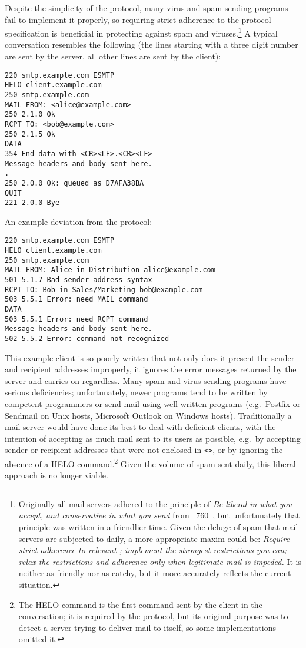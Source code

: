 \SMTPglossaryDescription{} Despite the simplicity of the protocol, many
virus and spam sending programs fail to implement it properly, so requiring
strict adherence to the protocol specification is beneficial in protecting
against spam and viruses.\footnote{Originally all mail servers adhered to
the principle of \textit{Be liberal in what you accept, and conservative in
what you send\/} from ~760~\cite{rfc760}, but unfortunately
that principle was written in a friendlier time.  Given the deluge of spam
that mail servers are subjected to daily, a more appropriate maxim could
be: \textit{Require strict adherence to relevant ; implement
the strongest restrictions you can; relax the restrictions and adherence
only when legitimate mail is impeded.\/}  It is neither as friendly nor as
catchy, but it more accurately reflects the current situation.} A typical
 conversation resembles the following (the lines starting
with a three digit number are sent by the server, all other lines are sent
by the client):

\begin{verbatim}
220 smtp.example.com ESMTP
HELO client.example.com
250 smtp.example.com
MAIL FROM: <alice@example.com>
250 2.1.0 Ok
RCPT TO: <bob@example.com>
250 2.1.5 Ok
DATA
354 End data with <CR><LF>.<CR><LF>
Message headers and body sent here.
.
250 2.0.0 Ok: queued as D7AFA38BA
QUIT
221 2.0.0 Bye
\end{verbatim}

An example deviation from the protocol:

\begin{verbatim}
220 smtp.example.com ESMTP
HELO client.example.com
250 smtp.example.com
MAIL FROM: Alice in Distribution alice@example.com
501 5.1.7 Bad sender address syntax
RCPT TO: Bob in Sales/Marketing bob@example.com
503 5.5.1 Error: need MAIL command
DATA
503 5.5.1 Error: need RCPT command
Message headers and body sent here.
502 5.5.2 Error: command not recognized
\end{verbatim}

This example client is so poorly written that not only does it present the
sender and recipient addresses improperly, it ignores the error messages
returned by the server and carries on regardless.  Many spam and virus
sending programs have serious deficiencies; unfortunately, newer programs
tend to be written by competent programmers or send mail using well written
programs (e.g.\ Postfix or Sendmail on Unix hosts, Microsoft Outlook on
Windows hosts).  Traditionally a mail server would have done its best to
deal with deficient clients, with the intention of accepting as much mail
sent to its users as possible, e.g.\ by accepting sender or recipient
addresses that were not enclosed in \texttt{<>}, or by ignoring the absence
of a HELO command.\footnote{The HELO command is the first command sent by
the client in the  conversation; it is required by the
protocol, but its original purpose was to detect a server trying to deliver
mail to itself, so some implementations omitted it.}  Given the volume of
spam sent daily, this liberal approach is no longer viable.

